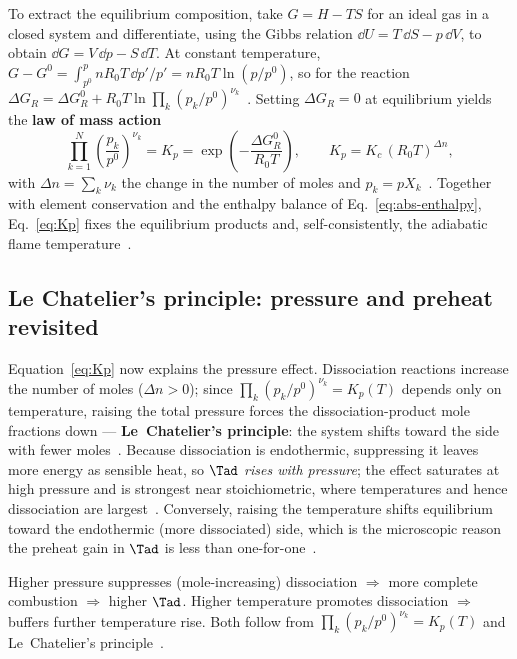 To extract the equilibrium composition, take $G=H-TS$ for an ideal gas in a closed system and differentiate, using the Gibbs relation $\dd U=T\,\dd S-p\,\dd V$, to obtain $\dd G=V\,\dd p-S\,\dd T$. At constant temperature, $G-G^0=\int_{p^0}^{p} nR_0T\,\dd p'/p' = nR_0T\ln(p/p^0)$, so for the reaction $\Delta G_R=\Delta G_R^0+R_0T\ln\prod_k (p_k/p^0)^{\nu_k}$~\cite{lecture2}. Setting $\Delta G_R=0$ at equilibrium yields the \textbf{law of mass action}
\begin{equation}
\prod_{k=1}^{N}\left(\frac{p_k}{p^0}\right)^{\nu_k}=K_p=\exp\!\left(-\frac{\Delta G_R^0}{R_0 T}\right),\qquad K_p=K_c\,(R_0T)^{\Delta n},
\label{eq:Kp}
\end{equation}
with $\Delta n=\sum_k\nu_k$ the change in the number of moles and $p_k=pX_k$~\cite{lecture2,warnatz2006combustion}. Together with element conservation and the enthalpy balance of Eq.~\eqref{eq:abs-enthalpy}, Eq.~\eqref{eq:Kp} fixes the equilibrium products and, self-consistently, the adiabatic flame temperature~\cite{lecture2,glassman2014combustion}.

\subsection{Le Chatelier's principle: pressure and preheat revisited}

Equation~\eqref{eq:Kp} now explains the pressure effect. Dissociation reactions increase the number of moles ($\Delta n>0$); since $\prod_k(p_k/p^0)^{\nu_k}=K_p(T)$ depends only on temperature, raising the total pressure forces the dissociation-product mole fractions down --- \textbf{Le~Chatelier's principle}: the system shifts toward the side with fewer moles~\cite{lecture2,transcript_tutorial}. Because dissociation is endothermic, suppressing it leaves more energy as sensible heat, so $\Tad$ \emph{rises with pressure}; the effect saturates at high pressure and is strongest near stoichiometric, where temperatures and hence dissociation are largest~\cite{lecture2,glassman2014combustion}. Conversely, raising the temperature shifts equilibrium toward the endothermic (more dissociated) side, which is the microscopic reason the preheat gain in $\Tad$ is less than one-for-one~\cite{transcript_tutorial}.

\begin{keybox}
Higher pressure suppresses (mole-increasing) dissociation $\Rightarrow$ more complete combustion $\Rightarrow$ higher $\Tad$. Higher temperature promotes dissociation $\Rightarrow$ buffers further temperature rise. Both follow from $\prod_k(p_k/p^0)^{\nu_k}=K_p(T)$ and Le~Chatelier's principle~\cite{lecture2}.
\end{keybox}

